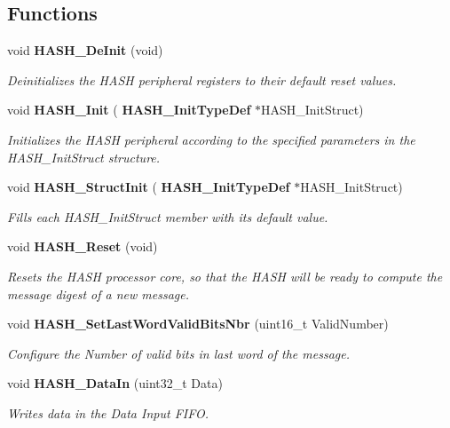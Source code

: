 \subsection*{Functions}
\begin{DoxyCompactItemize}
\item 
void \textbf{ H\+A\+S\+H\+\_\+\+De\+Init} (void)
\begin{DoxyCompactList}\small\item\em Deinitializes the H\+A\+SH peripheral registers to their default reset values. \end{DoxyCompactList}\item 
void \textbf{ H\+A\+S\+H\+\_\+\+Init} (\textbf{ H\+A\+S\+H\+\_\+\+Init\+Type\+Def} $\ast$H\+A\+S\+H\+\_\+\+Init\+Struct)
\begin{DoxyCompactList}\small\item\em Initializes the H\+A\+SH peripheral according to the specified parameters in the H\+A\+S\+H\+\_\+\+Init\+Struct structure. \end{DoxyCompactList}\item 
void \textbf{ H\+A\+S\+H\+\_\+\+Struct\+Init} (\textbf{ H\+A\+S\+H\+\_\+\+Init\+Type\+Def} $\ast$H\+A\+S\+H\+\_\+\+Init\+Struct)
\begin{DoxyCompactList}\small\item\em Fills each H\+A\+S\+H\+\_\+\+Init\+Struct member with its default value. \end{DoxyCompactList}\item 
void \textbf{ H\+A\+S\+H\+\_\+\+Reset} (void)
\begin{DoxyCompactList}\small\item\em Resets the H\+A\+SH processor core, so that the H\+A\+SH will be ready to compute the message digest of a new message. \end{DoxyCompactList}\item 
void \textbf{ H\+A\+S\+H\+\_\+\+Set\+Last\+Word\+Valid\+Bits\+Nbr} (uint16\+\_\+t Valid\+Number)
\begin{DoxyCompactList}\small\item\em Configure the Number of valid bits in last word of the message. \end{DoxyCompactList}\item 
void \textbf{ H\+A\+S\+H\+\_\+\+Data\+In} (uint32\+\_\+t Data)
\begin{DoxyCompactList}\small\item\em Writes data in the Data Input F\+I\+FO. \end{DoxyCompactList}\item 

\end{DoxyCompactItemize}
